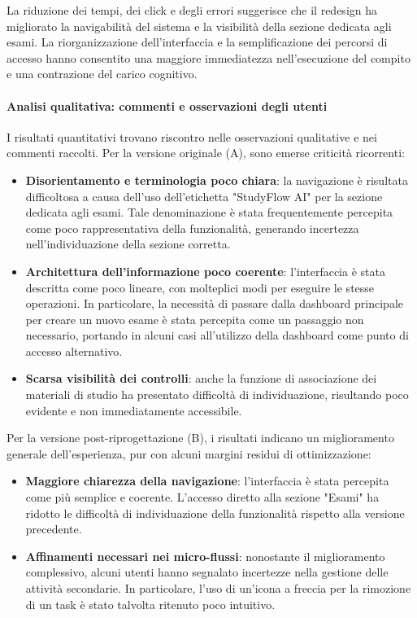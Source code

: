 La riduzione dei tempi, dei click e degli errori suggerisce che il redesign ha migliorato la navigabilità del sistema e la visibilità della sezione dedicata agli esami. La riorganizzazione dell’interfaccia e la semplificazione dei percorsi di accesso hanno consentito una maggiore immediatezza nell’esecuzione del compito e una contrazione del carico cognitivo.

\paragraph{Analisi qualitativa: commenti e osservazioni degli utenti}

I risultati quantitativi trovano riscontro nelle osservazioni qualitative e nei commenti raccolti. Per la versione originale (A), sono emerse criticità ricorrenti:

\begin{itemize}
	\item \textbf{Disorientamento e terminologia poco chiara}: la navigazione è risultata difficoltosa a causa dell’uso dell’etichetta "StudyFlow AI" per la sezione dedicata agli esami. Tale denominazione è stata frequentemente percepita come poco rappresentativa della funzionalità, generando incertezza nell’individuazione della sezione corretta.

	\item \textbf{Architettura dell’informazione poco coerente}: l’interfaccia è stata descritta come poco lineare, con molteplici modi per eseguire le stesse operazioni. In particolare, la necessità di passare dalla dashboard principale per creare un nuovo esame è stata percepita come un passaggio non necessario, portando in alcuni casi all’utilizzo della dashboard come punto di accesso alternativo.

	\item \textbf{Scarsa visibilità dei controlli}: anche la funzione di associazione dei materiali di studio ha presentato difficoltà di individuazione, risultando poco evidente e non immediatamente accessibile.
\end{itemize}

Per la versione post-riprogettazione (B), i risultati indicano un miglioramento generale dell’esperienza, pur con alcuni margini residui di ottimizzazione:

\begin{itemize}
	\item \textbf{Maggiore chiarezza della navigazione}: l’interfaccia è stata percepita come più semplice e coerente. L’accesso diretto alla sezione "Esami" ha ridotto le difficoltà di individuazione della funzionalità rispetto alla versione precedente.

	\item \textbf{Affinamenti necessari nei micro-flussi}: nonostante il miglioramento complessivo, alcuni utenti hanno segnalato incertezze nella gestione delle attività secondarie. In particolare, l’uso di un’icona a freccia per la rimozione di un task è stato talvolta ritenuto poco intuitivo.
\end{itemize}

